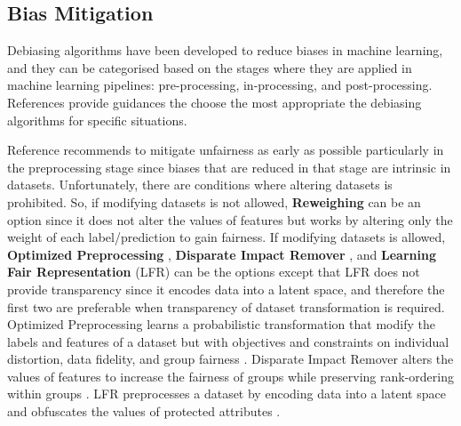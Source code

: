\documentclass[sigconf,review]{acmart}
\begin{document}
\subsection{Bias Mitigation}
\label{sec:bias_mitigation}

Debiasing algorithms have been developed to reduce biases in machine learning, and they can be categorised based on the stages where they are applied in machine learning pipelines: pre-processing, in-processing, and post-processing. References \cite{mahoney2020ai,ibmaif3602022guidance} provide guidances the choose the most appropriate the debiasing algorithms for specific situations.

Reference \cite{mahoney2020ai} recommends to mitigate unfairness as early as possible particularly in the preprocessing stage since biases that are reduced in that stage are intrinsic in datasets. Unfortunately, there are conditions where altering datasets is prohibited. So, if modifying datasets is not allowed, \textbf{Reweighing} \cite{kamiran2011reweighing} can be an option since it does not alter the values of features but works by altering only the weight of each label/prediction to gain fairness. If modifying datasets is allowed, \textbf{Optimized Preprocessing} \cite{calmon2017optimized}, \textbf{Disparate Impact Remover} \cite{feldman2015disparate}, and \textbf{Learning Fair Representation} (LFR) \cite{zemel2013lfr} can be the options except that LFR does not provide transparency since it encodes data into a latent space, and therefore the first two are preferable when transparency of dataset transformation is required.
Optimized Preprocessing learns a probabilistic transformation that modify the labels and features of a dataset but with objectives and constraints on individual distortion, data fidelity, and group fairness \cite{mahoney2020ai,calmon2017optimized}.
Disparate Impact Remover alters the values of features to increase the fairness of groups while preserving rank-ordering within groups \cite{mahoney2020ai,feldman2015disparate}.
LFR preprocesses a dataset by encoding data into a latent space and obfuscates the values of protected attributes \cite{mahoney2020ai,zemel2013lfr}.
\end{document}
